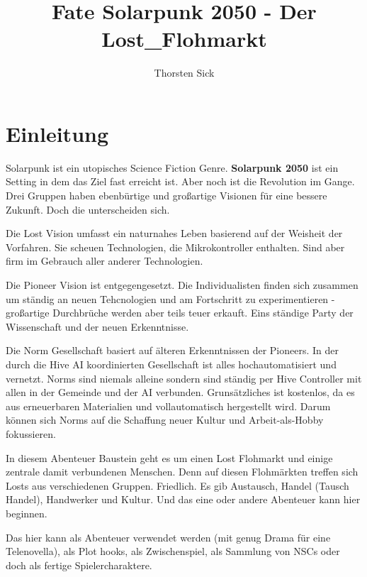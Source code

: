 \documentclass{book}
\title{Fate Solarpunk 2050 - Der Lost_Flohmarkt}
\author{Thorsten Sick}
\begin{document}

\chapter{Einleitung}

Solarpunk ist ein utopisches Science Fiction Genre. \textbf{Solarpunk 2050} ist ein Setting in dem das Ziel fast erreicht ist. Aber noch ist die Revolution im Gange. Drei Gruppen haben ebenbürtige und großartige Visionen für eine bessere Zukunft. Doch die unterscheiden sich.

Die Lost Vision umfasst ein naturnahes Leben basierend auf der Weisheit der Vorfahren. Sie scheuen Technologien, die Mikrokontroller enthalten. Sind aber firm im Gebrauch aller anderer Technologien.

Die Pioneer Vision ist entgegengesetzt. Die Individualisten finden sich zusammen um ständig an neuen Tehcnologien und am Fortschritt zu experimentieren - großartige Durchbrüche werden aber teils teuer erkauft. Eins ständige Party der Wissenschaft und der neuen Erkenntnisse.

Die Norm Gesellschaft basiert auf älteren Erkenntnissen der Pioneers. In der durch die Hive AI koordinierten Gesellschaft ist alles hochautomatisiert und vernetzt. Norms sind niemals alleine sondern sind ständig per Hive Controller mit allen in der Gemeinde und der AI verbunden. Grunsätzliches ist kostenlos, da es aus erneuerbaren Materialien und vollautomatisch hergestellt wird. Darum können sich Norms auf die Schaffung neuer Kultur und Arbeit-als-Hobby fokussieren.

In diesem Abenteuer Baustein geht es um einen Lost Flohmarkt und einige zentrale damit verbundenen Menschen. Denn auf diesen Flohmärkten treffen sich Losts aus verschiedenen Gruppen. Friedlich. Es gib Austausch, Handel (Tausch Handel), Handwerker und Kultur. Und das eine oder andere Abenteuer kann hier beginnen.

Das hier kann als Abenteuer verwendet werden (mit genug Drama für eine Telenovella), als Plot hooks, als Zwischenspiel, als Sammlung von NSCs oder doch als fertige Spielercharaktere.






\end{document}
